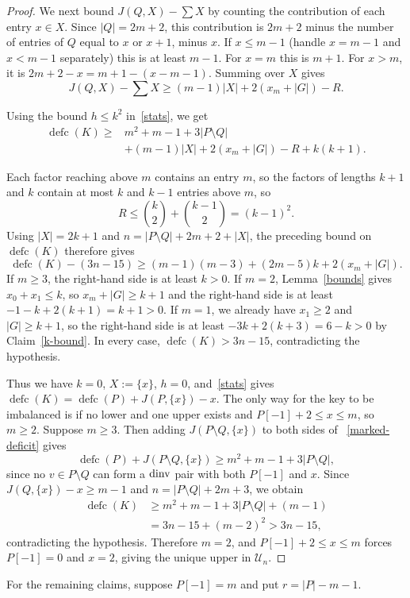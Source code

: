 \documentclass[11pt]{article}
\DeclareMathOperator{\defc}{defc}\DeclareMathOperator{\sym}{sym}
\begin{document}
\begin{proof}
We next bound $J(Q,X)-\sum X$ by counting the contribution of each entry $x\in X$. Since $|Q|=2m+2$, this contribution is $2m+2$ minus the number of entries of $Q$ equal to $x$ or $x+1$, minus $x$. If $x \le m-1$ (handle $x=m-1$ and $x<m-1$ separately) this is at least $m-1$. For $x=m$ this is $m+1$. For $x>m$, it is $2m+2-x=m+1-(x-m-1)$. Summing over $X$ gives
\[
 J(Q,X)-\sum X\ge(m-1)|X|+2(x_m+|G|)-R.
\]

Using the bound $h\le k^2$ in~\eqref{stats}, we get
\[
 \begin{aligned}
 \defc(K)\ge{}&m^2+m-1+3|P\setminus Q|\\
 &+(m-1)|X|+2(x_m+|G|)-R+k(k+1).
 \end{aligned}
\]

Each factor reaching above $m$ contains an entry $m$, so the factors of lengths $k+1$ and $k$ contain at most $k$ and $k-1$ entries above $m$, so
\[
 R\le\binom k2+\binom{k-1}2=(k-1)^2.
\]
Using $|X|=2k+1$ and $n=|P\setminus Q|+2m+2+|X|$, the preceding bound on $\defc(K)$ therefore gives
\[
 \defc(K)-(3n-15)\ge(m-1)(m-3)+(2m-5)k+2(x_m+|G|).
\]
If $m\ge3$, the right-hand side is at least $k>0$. If $m=2$, Lemma~\ref{bounds} gives $x_0+x_1\le k$, so $x_m+|G|\ge k+1$ and the right-hand side is at least $-1-k+2(k+1)=k+1>0$. If $m=1$, we already have $x_1\ge2$ and $|G|\ge k+1$, so the right-hand side is at least $-3k+2(k+3)=6-k>0$ by Claim~\ref{k-bound}. In every case, $\defc(K)>3n-15$, contradicting the hypothesis.

Thus we have $k=0$, $X:=\{x\}$, $h=0$, and~\eqref{stats} gives $\defc(K)=\defc(P)+J(P,\{x\})-x$. The only way for the key to be imbalanced is if no lower and one upper exists and $P[-1]+2\le x\le m$, so $m\ge2$.
Suppose $m\ge3$. Then adding $J(P\setminus Q,\{x\})$ to both sides of ~\eqref{marked-deficit} gives
\[
 \defc(P)+J(P\setminus Q,\{x\})\ge m^2+m-1+3|P\setminus Q|,
\]
since no $v \in P \setminus Q$ can form a $\operatorname{dinv}$ pair with both $P[-1]$ and $x$. 
Since $J(Q,\{x\})-x\ge m-1$ and $n=|P\setminus Q|+2m+3$, we obtain
\[
 \begin{aligned}
 \defc(K)&\ge m^2+m-1+3|P\setminus Q|+(m-1)\\
 &=3n-15+(m-2)^2>3n-15,
 \end{aligned}
\]
contradicting the hypothesis. Therefore $m=2$, and $P[-1]+2\le x\le m$ forces $P[-1]=0$ and $x=2$, giving the unique upper in $\mathcal U_n$.
\end{proof}

For the remaining claims, suppose $P[-1]=m$ and put $r=|P|-m-1$.
\end{document}
